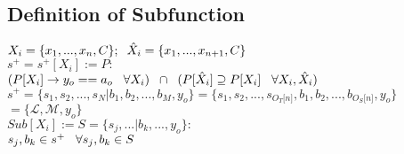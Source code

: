 \documentclass[11pt]{article}
\begin{document}
\subsection{Definition of Subfunction}
\vspace{1mm}
\begin{center}
$
X_i = \{x_1,...,x_n,C\}; \hspace{2mm} \hat{X}_i = \{x_1,...,x_{n+1},C\}
$
\\ \vspace{2mm}
$
s^+ = s^+[X_i] := P :
$
\\ \vspace{2mm}
$
(P \lbrack X_i \rbrack \rightarrow y_{o} == a_{o} \hspace{3mm} \forall X_i) \hspace{2mm} \cap \hspace{2mm} (P[\hat{X}_i] \supseteq P[X_i] \hspace{3mm} \forall X_i,\hat{X}_i)
$
\\ \vspace{4mm}
$
s^+ = \{ s_1,s_2,...,s_N|b_1,b_2,...,b_M,y_o\} = \{ s_1,s_2,...,s_{O_T \lbrack n \rbrack }, b_1, b_2,...,b_{O_S \lbrack n \rbrack},y_o \}
$
\\ \vspace{2mm}
$
= \{ \mathcal{L},\mathcal{M},y_o\}
$
\\ \vspace{6mm}
$
Sub[X_i] := S = \{s_j,...|b_k,...,y_o\}:
$
\\ \vspace{2mm}
$
s_j,b_k \in s^+ \hspace{3mm} \forall s_j,b_k \in S
$
\end{center}
\end{document}
